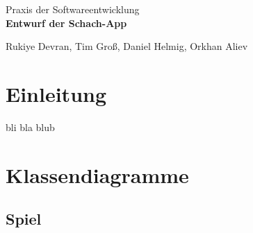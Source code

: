 \documentclass[parskip=full]{scrartcl}
\begin{document}
	\begin{titlepage}
			
		\centering
		\vspace*{0.2\textheight}
		{\Large Praxis der Softwareentwicklung}\\[\baselineskip]
		\vspace{2cm}
		{\Huge \textbf{Entwurf der Schach-App}}\\[\baselineskip]\par
		\vspace{2cm}
		{\LARGE Rukiye Devran, Tim Groß, Daniel Helmig, Orkhan Aliev}\par		
		\newpage	
		\tableofcontents
		\pagebreak
		
	\end{titlepage}
	\section{Einleitung}
		bli bla blub
	\section{Klassendiagramme}
	
		\subsection{Spiel}
		
\end{document}
